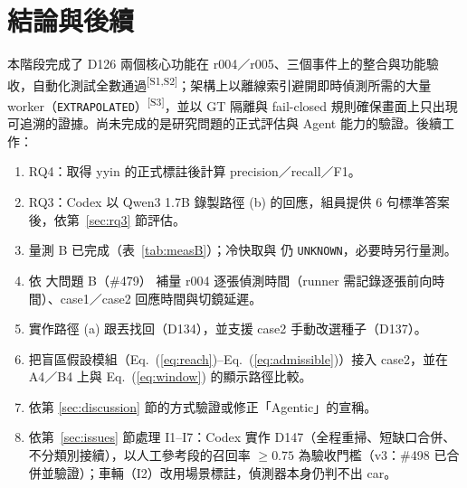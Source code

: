 \documentclass[11pt,a4paper]{article}
\newcommand{\src}[1]{\textsuperscript{\scriptsize[#1]}}
\newcommand{\UNK}{\texttt{UNKNOWN}}
\newcommand{\EXT}{\texttt{EXTRAPOLATED}}
\newcommand{\code}[1]{\texttt{\detokenize{#1}}}
\renewcommand{\eqref}[1]{Eq.~(\ref{#1})}
\begin{document}
\section{結論與後續}
本階段完成了 D126 兩個核心功能在 r004／r005、三個事件上的整合與功能驗收，自動化測試全數通過\src{S1,S2}；架構上以離線索引避開即時偵測所需的大量 worker（\EXT）\src{S3}，並以 GT 隔離與 fail-closed 規則確保畫面上只出現可追溯的證據。尚未完成的是研究問題的正式評估與 Agent 能力的驗證。後續工作：
\begin{enumerate}
  \item RQ4：取得 yyin 的正式標註後計算 precision／recall／F1。
  \item RQ3：Codex 以 Qwen3 1.7B 錄製路徑 (b) 的回應，組員提供 6 句標準答案後，依第~\ref{sec:rq3} 節評估。
  \item 量測 B 已完成（表~\ref{tab:measB}）；冷快取與 \code{paint_ms} 仍 \UNK，必要時另行量測。
  \item 依 大問題 B（\#479） 補量 r004 逐張偵測時間（runner 需記錄逐張前向時間）、case1／case2 回應時間與切鏡延遲。
  \item 實作路徑 (a) 跟丟找回（D134），並支援 case2 手動改選種子（D137）。
  \item 把盲區假設模組（\eqref{eq:reach}–\eqref{eq:admissible}）接入 case2，並在 A4／B4 上與 \eqref{eq:window} 的顯示路徑比較。
  \item 依第 \ref{sec:discussion} 節的方式驗證或修正「Agentic」的宣稱。
  \item 依第~\ref{sec:issues} 節處理 I1–I7：Codex 實作 D147（全程重掃、短缺口合併、不分類別接續），以人工參考段的召回率 $\ge 0.75$ 為驗收門檻（v3：\#498 已合併並驗證）；車輛（I2）改用場景標註，偵測器本身仍判不出 car。
\end{enumerate}
\end{document}
